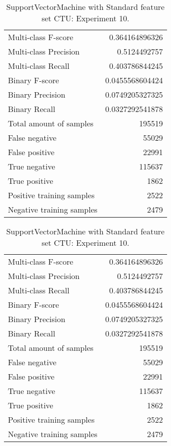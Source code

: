 \begin{table}[H]
\begin{minipage}{0.5\textwidth}
\caption{SupportVectorMachine with Standard feature set CTU: Experiment 9.}
\centering
\begin{tabular}{l r}
\toprule
Multi-class F-score & 0.364164896326 \\
Multi-class Precision & 0.5124492757 \\
Multi-class Recall & 0.403786844245 \\
\midrule
Binary F-score & 0.0455568604424 \\
Binary Precision & 0.0749205327325 \\
Binary Recall & 0.0327292541878 \\
\midrule
Total amount of samples & 195519 \\
False negative & 55029 \\
False positive & 22991 \\
True negative & 115637 \\
True positive & 1862 \\
\midrule
Positive training samples & 2522 \\
Negative training samples & 2479 \\
\bottomrule
\end{tabular}
\end{minipage}
\hfillx
\begin{minipage}{0.5\textwidth}
\caption{SupportVectorMachine with Standard feature set CTU: Experiment 10.}
\centering
\begin{tabular}{l r}
\toprule
Multi-class F-score & 0.364164896326 \\
Multi-class Precision & 0.5124492757 \\
Multi-class Recall & 0.403786844245 \\
\midrule
Binary F-score & 0.0455568604424 \\
Binary Precision & 0.0749205327325 \\
Binary Recall & 0.0327292541878 \\
\midrule
Total amount of samples & 195519 \\
False negative & 55029 \\
False positive & 22991 \\
True negative & 115637 \\
True positive & 1862 \\
\midrule
Positive training samples & 2522 \\
Negative training samples & 2479 \\
\bottomrule
\end{tabular}
\end{minipage}
\end{table}
